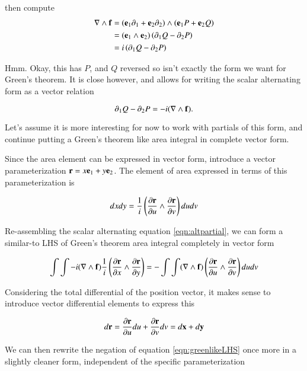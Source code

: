 \documentclass{article}
\newcommand{\grad}[0]{\nabla}
\newcommand{\PD}[2]{\frac{\partial {#2}}{\partial {#1}}}
\begin{document}
then compute
\begin{align*}
\grad \wedge \Bf
&= \left( \Be_1 \partial_1 + \Be_2 \partial_2 \right) \wedge \left( \Be_1 P + \Be_2 Q \right) \\
&= (\Be_{1} \wedge \Be_2) \left( \partial_1 Q - \partial_2 P \right) \\
&= i \left( \partial_1 Q - \partial_2 P \right) \\
\end{align*}

Hmm.  Okay, this has $P$, and $Q$ reversed so isn't exactly the form we want for Green's theorem.  It is close however, and allows for writing the scalar alternating form as a vector relation

\begin{equation}\label{eqn:altpartial}
\partial_1 Q - \partial_2 P = - i(\grad \wedge \Bf).
\end{equation}

Let's assume it is more interesting for now to work with partials of this form, and continue putting a Green's theorem like
area integral in complete vector form.

Since the area element can be expressed in vector form, introduce a vector parameterization $\mathbf{r} = x \mathbf{e}_1 + y \mathbf{e}_2$.  The element
of area expressed in terms of this parameterization is

\begin{equation*}
dx dy = \inv{i}\left( \PD{u}{\Br} \wedge \PD{v}{\Br} \right) du dv
\end{equation*}

Re-assembling the scalar alternating equation \ref{eqn:altpartial}, we can form a similar-to LHS of Green's theorem area integral completely in vector form

\begin{equation}\label{eqn:greenlikeLHS}
\int\int - i(\grad \wedge \Bf) \inv{i}\left( \PD{x}{\Br} \wedge \PD{y}{\Br} \right)
= -\int\int (\grad \wedge \Bf) \left( \PD{u}{\Br} \wedge \PD{v}{\Br} \right) du dv
\end{equation}

Considering the total differential of the position vector, it makes sense to introduce vector differential elements to
express this

\begin{equation*}
d\Br = \PD{u}{\Br} du + \PD{v}{\Br} dv = d\Bx + d\By
\end{equation*}

We can then rewrite the negation of equation \ref{eqn:greenlikeLHS}
once more in a slightly cleaner form, independent of the specific parameterization
\end{document}

